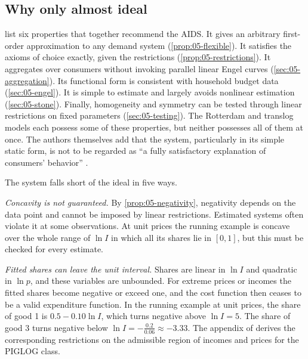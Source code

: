 \subsection{Why only almost ideal}\label{sec:05-aids-limits}

\citet[p.~312]{DeatonMuellbauer1980a} list six properties that together recommend the AIDS. It gives an
arbitrary first-order approximation to any demand system (\cref{prop:05-flexible}). It satisfies the axioms
of choice exactly, given the restrictions (\cref{prop:05-restrictions}). It aggregates over consumers without
invoking parallel linear Engel curves (\cref{sec:05-aggregation}). Its functional form is consistent with
household budget data (\cref{sec:05-engel}). It is simple to estimate and largely avoids nonlinear estimation
(\cref{sec:05-stone}). Finally, homogeneity and symmetry can be tested through linear restrictions on fixed
parameters (\cref{sec:05-testing}). The Rotterdam and translog models each possess some of these properties,
but neither possesses all of them at once. The authors themselves add that the system, particularly in its
simple static form, is not to be regarded as ``a fully satisfactory explanation of consumers' behavior''
\citep[p.~312]{DeatonMuellbauer1980a}.

The system falls short of the ideal in five ways.

\emph{Concavity is not guaranteed.} By \cref{prop:05-negativity}, negativity depends on the data point and
cannot be imposed by linear restrictions. Estimated systems often violate it at some observations. At unit
prices the running example is concave over the whole range of $\ln I$ in which all its shares lie in
$[0, 1]$, but this must be checked for every estimate.

\emph{Fitted shares can leave the unit interval.} Shares are linear in $\ln I$ and quadratic in $\ln p$, and
these variables are unbounded. For extreme prices or incomes the fitted shares become negative or exceed one, and the cost
function then ceases to be a valid expenditure function. In the running example at unit prices, the share of
good 1 is $0.5 - 0.10\ln I$, which turns negative above $\ln I = 5$. The share of good 3 turns negative below
$\ln I = -\frac{0.2}{0.06} \approx -3.33$. The appendix of \citet[p.~324]{DeatonMuellbauer1980a} derives the
corresponding restrictions on the admissible region of incomes and prices for the PIGLOG class.

